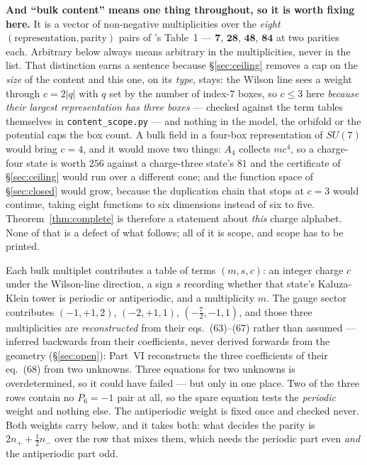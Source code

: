 \documentclass[11pt,a4paper]{article}
\newcommand{\su}[1]{SU(#1)}
\newcommand{\rep}[1]{\mathbf{#1}}
\begin{document}
\noindent \textbf{And ``bulk content'' means one thing throughout, so it is worth fixing here.} It
is a vector of non-negative multiplicities over the \emph{eight} $(\text{representation},
\text{parity})$ pairs of \cite{KM25}'s Table~1 --- $\rep7$, $\rep{28}$, $\rep{48}$, $\rep{84}$ at
two parities each. Arbitrary below always means arbitrary in the multiplicities, never in the list.
That distinction earns a sentence because \S\ref{sec:ceiling} removes a cap on the \emph{size} of
the content and this one, on its \emph{type}, stays: the Wilson line sees a weight through
$c=2|q|$ with $q$ set by the number of index-$7$ boxes, so $c\le3$ here \emph{because their largest
representation has three boxes} --- checked against the term tables themselves in
\texttt{content\_\allowbreak scope.py} --- and nothing in the model, the orbifold or the potential
caps the box count. A bulk field in a four-box representation of $\su7$ would bring $c=4$, and it
would move two things: $A_4$ collects $mc^4$, so a charge-four state is worth $256$ against a
charge-three state's $81$ and the certificate of \S\ref{sec:ceiling} would run over a different
cone; and the function space of \S\ref{sec:closed} would grow, because the duplication chain that
stops at $c=3$ would continue, taking eight functions to six dimensions instead of six to five.
Theorem~\ref{thm:complete} is therefore a statement about \emph{this} charge alphabet. None of that
is a defect of what follows; all of it is scope, and scope has to be printed.

\noindent Each bulk multiplet contributes a table of terms $(m,s,c)$: an integer charge $c$ under the
Wilson-line direction, a sign $s$ recording whether that state's Kaluza-Klein tower is periodic or
antiperiodic, and a multiplicity $m$. The gauge sector contributes
$(-1,+1,2)$, $(-2,+1,1)$, $(-\tfrac72,-1,1)$, and those three multiplicities are \emph{reconstructed} from
their eqs.~(63)--(67) rather than assumed --- inferred backwards from their coefficients, never
derived forwards from the geometry (\S\ref{sec:open}): Part~VI reconstructs the three coefficients of their
eq.~(68) from two unknowns. Three equations for two unknowns is overdetermined, so it could have
failed --- but only in one place. Two of the three rows contain no $P_6=-1$ pair at all, so the
spare equation tests the \emph{periodic} weight and nothing else. The antiperiodic weight is fixed
once and checked never. Both weights carry below, and it takes both: what decides the parity is
$2n_++\tfrac12 n_-$ over the row that mixes them, which needs the periodic part even \emph{and} the
antiperiodic part odd.
\end{document}
